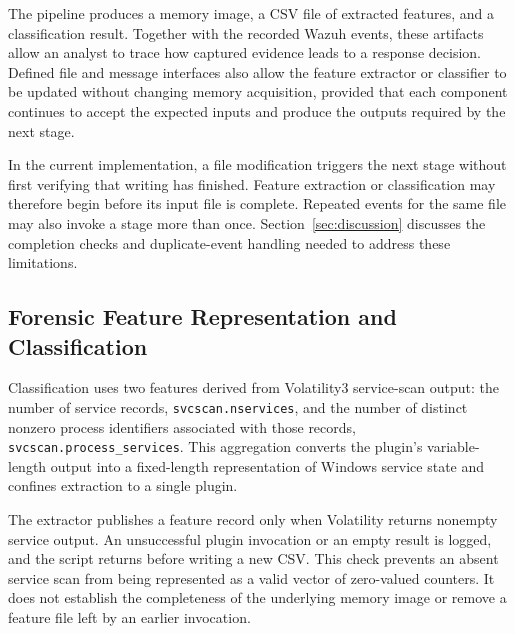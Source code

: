 \documentclass[conference]{IEEEtran}
\begin{document}


The pipeline produces a memory image, a CSV file of extracted features, and a classification result. Together with the recorded Wazuh events, these artifacts allow an analyst to trace how captured evidence leads to a response decision. Defined file and message interfaces also allow the feature extractor or classifier to be updated without changing memory acquisition, provided that each component continues to accept the expected inputs and produce the outputs required by the next stage.

In the current implementation, a file modification triggers the next stage without first verifying that writing has finished. Feature extraction or classification may therefore begin before its input file is complete. Repeated events for the same file may also invoke a stage more than once. Section~\ref{sec:discussion} discusses the completion checks and duplicate-event
handling needed to address these limitations.


\subsection{Forensic Feature Representation and Classification}
Classification uses two features derived from Volatility3 service-scan output: the number of service records, \texttt{svcscan.nservices}, and the number of distinct nonzero process identifiers associated with those records, \texttt{svcscan.process\_services}. This aggregation converts the plugin's variable-length output into a fixed-length representation of Windows service state and confines extraction to a single plugin.

The extractor publishes a feature record only when Volatility returns
nonempty service output. An unsuccessful plugin invocation or an empty result
is logged, and the script returns before writing a new CSV. This check
prevents an absent service scan from being represented as a valid vector of
zero-valued counters. It does not establish the completeness of the underlying
memory image or remove a feature file left by an earlier invocation.
\end{document}
